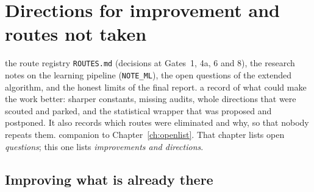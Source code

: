 \chapter{Directions for improvement and routes not taken}\label{ch:improve}
\chapterbrief
{the route registry \texttt{ROUTES.md} (decisions at Gates~1, 4a, 6 and 8), the research notes on the learning pipeline (\texttt{NOTE\_ML}), the open questions of the extended algorithm, and the honest limits of the final report.}
{a record of what could make the work better: sharper constants, missing audits, whole directions that were scouted and parked, and the statistical wrapper that was proposed and postponed. It also records which routes were eliminated and why, so that nobody repeats them.}
{companion to Chapter~\ref{ch:openlist}. That chapter lists open \emph{questions}; this one lists \emph{improvements and directions}.}

\section{Improving what is already there}

